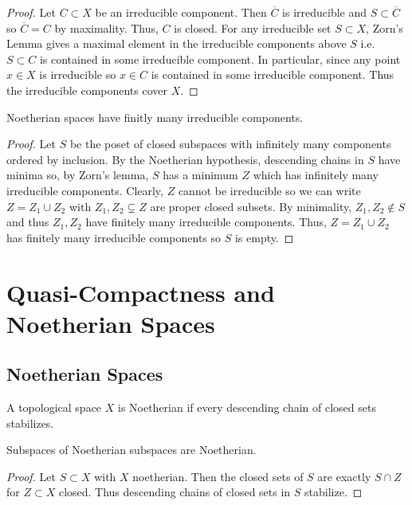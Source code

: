 \documentclass[12pt]{article}
\begin{document}
\begin{proof}
Let $C \subset X$ be an irreducible component. Then $\overline{C}$ is irreducible and $S \subset \overline{C}$ so $\overline{C} = C$ by maximality. Thus, $C$ is closed. For any irreducible set $S \subset X$, Zorn's Lemma gives a maximal element in the irreducible components above $S$ i.e. $S \subset C$ is contained in some irreducible component. In particular, since any point $x \in X$ is irreducible so $x \in C$ is contained in some irreducible component. Thus the irreducible components cover $X$.
\end{proof}

\begin{lemma}
Noetherian spaces have finitly many irreducible components.
\end{lemma}

\begin{proof}
Let $S$ be the poset of closed subspaces with infinitely many components ordered by inclusion. By the Noetherian hypothesis, descending chains in $S$ have minima so, by Zorn's lemma, $S$ has a minimum $Z$ which has infinitely many irreducible components. Clearly, $Z$ cannot be irreducible so we can write $Z = Z_1 \cup Z_2$ with $Z_1, Z_2 \subsetneq Z$ are proper closed subsets. By minimality, $Z_1, Z_2 \notin S$ and thus $Z_1, Z_2$ have finitely many irreducible components. Thus, $Z = Z_1 \cup Z_2$ has finitely many irreducible components so $S$ is empty. 
\end{proof}



\section{Quasi-Compactness and Noetherian Spaces}

\subsection{Noetherian Spaces}

\begin{defn}
A topological space $X$ is Noetherian if every descending chain of closed sets stabilizes.
\end{defn}

\begin{lemma}
Subspaces of Noetherian subspaces are Noetherian.
\end{lemma}

\begin{proof}
Let $S \subset X$ with $X$ noetherian. Then the closed sets of $S$ are exactly $S \cap Z$ for $Z \subset X$ closed. Thus descending chains of closed sets in $S$ stabilize.
\end{proof}
\end{document}
